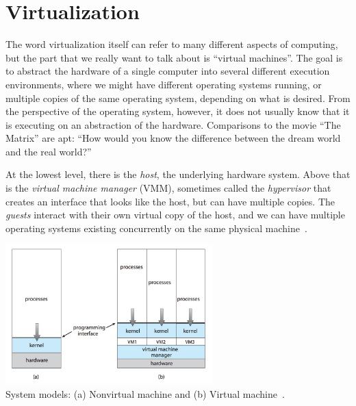 




\section*{Virtualization}

The word virtualization itself can refer to many different aspects of computing, but the part that we really want to talk about is ``virtual machines''. The goal is to abstract the hardware of a single computer into several different execution environments, where we might have different operating systems running, or multiple copies of the same operating system, depending on what is desired. From the perspective of the operating system, however, it does not usually know that it is executing on an abstraction of the hardware. Comparisons to the movie ``The Matrix'' are apt: ``How would you know the difference between the dream world and the real world?''

At the lowest level, there is the \textit{host}, the underlying hardware system. Above that is the \textit{virtual machine manager} (VMM), sometimes called the \textit{hypervisor} that creates an interface that looks like the host, but can have multiple copies. The \textit{guests} interact with their own virtual copy of the host, and we can have multiple operating systems existing concurrently on the same physical machine~\cite{osc}. 

\begin{center}
	\includegraphics[width=0.6\textwidth]{images/non-virtual-machine.png}\\
	System models: (a) Nonvirtual machine and (b) Virtual machine~\cite{osc}.
\end{center}


